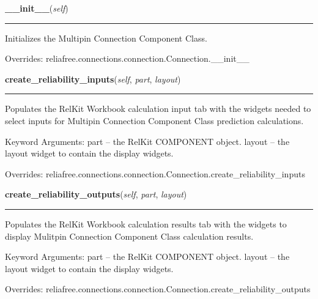     \vspace{0.5ex}

\hspace{.8\funcindent}\begin{boxedminipage}{\funcwidth}

    \raggedright \textbf{\_\_init\_\_}(\textit{self})

    \vspace{-1.5ex}

    \rule{\textwidth}{0.5\fboxrule}
\setlength{\parskip}{2ex}
    Initializes the Multipin Connection Component Class.

\setlength{\parskip}{1ex}
      Overrides: reliafree.connections.connection.Connection.\_\_init\_\_

    \end{boxedminipage}

    \vspace{0.5ex}

\hspace{.8\funcindent}\begin{boxedminipage}{\funcwidth}

    \raggedright \textbf{create\_reliability\_inputs}(\textit{self}, \textit{part}, \textit{layout})

    \vspace{-1.5ex}

    \rule{\textwidth}{0.5\fboxrule}
\setlength{\parskip}{2ex}
    Populates the RelKit Workbook calculation input tab with the widgets
    needed to select inputs for Multipin Connection Component Class 
    prediction calculations.

    Keyword Arguments: part   -- the RelKit COMPONENT object. layout -- 
    the layout widget to contain the display widgets.

\setlength{\parskip}{1ex}
      Overrides: reliafree.connections.connection.Connection.create\_reliability\_inputs

    \end{boxedminipage}

    \vspace{0.5ex}

\hspace{.8\funcindent}\begin{boxedminipage}{\funcwidth}

    \raggedright \textbf{create\_reliability\_outputs}(\textit{self}, \textit{part}, \textit{layout})

    \vspace{-1.5ex}

    \rule{\textwidth}{0.5\fboxrule}
\setlength{\parskip}{2ex}
    Populates the RelKit Workbook calculation results tab with the 
    widgets to display Mulitpin Connection Component Class calculation 
    results.

    Keyword Arguments: part   -- the RelKit COMPONENT object. layout -- 
    the layout widget to contain the display widgets.

\setlength{\parskip}{1ex}
      Overrides: reliafree.connections.connection.Connection.create\_reliability\_outputs

    \end{boxedminipage}

